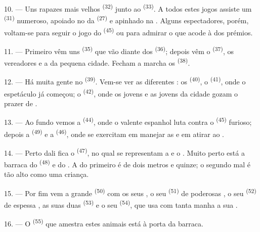 10. --- Uns rapazes mais velhos  \textsuperscript{(32)}
junto ao  \textsuperscript{(33)}. A todos estes jogos assiste um
 \textsuperscript{(31)} numeroso, apoiado no  da
 \textsuperscript{(27)} e apinhado na . Alguns
espectadores, porém, voltam-se para seguir o jogo do 
\textsuperscript{(45)} ou para admirar o  que acode à
 dos prémios.

11. --- Primeiro vêm uns  \textsuperscript{(35)} que vão diante
dos  \textsuperscript{(36)}; depois vêm o  \textsuperscript{(37)}, os vereadores e a  da
pequena cidade. Fecham a marcha os  \textsuperscript{(38)}.

\VUsaut{5.0mm}
\VUsaut{3.6mm}

12. --- Há muita gente no  \textsuperscript{(39)}.
Vem-se ver as diferentes : os  \textsuperscript{(40)}, o  \textsuperscript{(41)}, onde o
espetáculo já começou; o  \textsuperscript{(42)}, onde os
jovens e as jovens da cidade gozam o prazer de .

13. --- Ao fundo vemos a  \textsuperscript{(44)}, onde o
valente  espanhol luta contra o 
\textsuperscript{(45)} furioso; depois a 
\textsuperscript{(49)} e a  \textsuperscript{(46)}, onde se
exercitam em manejar as  e em atirar ao
.

14. --- Perto dali fica o  \textsuperscript{(47)}, no qual
se representam a  e o . Muito perto está a
barraca do  \textsuperscript{(48)} e do . A
 do primeiro é de dois metros e quinze; o segundo mal é
tão alto como uma criança.

15. --- Por fim vem a grande  \textsuperscript{(50)} com
os seus , o seu  \textsuperscript{(51)} de
poderosas , o seu  \textsuperscript{(52)} de espessa
, as suas duas  \textsuperscript{(53)} e o seu
 \textsuperscript{(54)}, que usa com tanta manha a sua
.

16. --- O  \textsuperscript{(55)} que amestra estes animais está à
porta da barraca.
\VUsaut{6.0mm}
\VUfilet{22mm}
